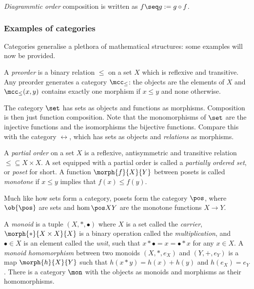 \begin{notation}
    \emph{Diagrammtic order} composition is written as
    \(f \seq g := g \circ f\).
\end{notation}

\subsubsection{Examples of categories}

Categories generalise a plethora of mathematical structures: some examples will
now be provided.

\begin{example}[Preorder]
    A \emph{preorder} is a binary relation \(\leq\) on a set \(X\) which is
    reflexive and transitive.
    Any preorder generates a category \(\mcc_\leq\): the objects are the
    elements of \(X\) and \(\mcc_\leq(x, y)\) contains exactly one morphism if
    \(x \leq y\) and none otherwise.
\end{example}

\begin{example}[Sets]
    The category \(\set\) has sets as objects and functions as morphisms.
    Composition is then just function composition.
    Note that the monomorphisms of \(\set\) are the injective functions and the
    isomorphisms the bijective functions.
    Compare this with the category \(\rel\), which has sets as objects and
    \emph{relations} as morphisms.
\end{example}

\begin{example}[Posets]
    A \emph{partial order} on a set \(X\) is a reflexive, antisymmetric and
    transitive relation \(\leq \subseteq X \times X\).
    A set equipped with a partial order is called a
    \emph{partially ordered set}, or \emph{poset} for short.
    A function \(\morph{f}{X}{Y}\) between posets is called \emph{monotone} if
    \(x \leq y\) implies that \(f(x) \leq f(y)\).

    Much like how sets form a category, posets form the category \(\pos\), where
    \(\ob{\pos}\) are sets and \(\hom{\pos}{X}{Y}\) are the monotone functions
    \(X \to Y\).
\end{example}

\begin{example}[Monoids]
    A \emph{monoid} is a tuple \((X, *, \bullet)\) where \(X\) is a set called
    the \emph{carrier}, \(\morph{*}{X \times X}{X}\) is a binary operation
    called the \emph{multiplication}, and \(\bullet \in X\) is an element called
    the \emph{unit}, such that \(x * \bullet = x = \bullet * x\) for any
    \(x \in X\).
    A \emph{monoid homomorphism} between two monoids \((X, *, e_X)\) and
    \((Y, +, e_Y)\) is a map \(\morph{h}{X}{Y}\) such that
    \(h(x * y) = h(x) + h(y)\) and \(h(e_X) = e_Y\).
    There is a category \(\mon\) with the objects as monoids and morphisms as
    their homomorphisms.
\end{example}

